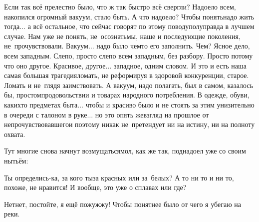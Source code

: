 Если так всё прелестно было, что ж так быстро всё свергли? Надоело всем, накопился огромный вакуум, стало быть. А что надоело? Чтобы понять\mdash надо жить тогда$\ldots$ а всё остальное, что сейчас говорят по этому поводу\mdash полуправда в лучшем случае. Нам уже не понять, не~осознать\mdash мы, наше и последующие поколения, не~прочувствовали. Вакуум$\ldots$ надо было чем\sdash то его заполнить. Чем? Ясное дело, всем западным. Слепо, просто слепо всем западным, без разбору. Просто потому что оно другое. Красивое, другое$\ldots$ западное, одним словом. И это и есть наша самая большая трагедия\mdash ломать, не реформируя в здоровой конкуренции, старое. Ломать и не~глядя заимствовать. А вакуум, надо полагать, был в самом, казалось бы, простом\mdash продовольствии и товарах народного потребления. В одежде, обуви, каких\sdash то предметах быта$\ldots$ чтобы и красиво было и не стоять за этим унизительно в очереди с талоном в руке$\ldots$ но это опять же\mdash взгляд на прошлое от непрочувствовавшего\mdash и поэтому никак не~претендует ни на истину, ни на полноту охвата.

Тут многие снова начнут возмущаться\mdash мол, как же так, поднадоел уже со своим нытьём:

\diagdash Ты определись-ка, за кого ты\mdash за красных или за~белых? А то ни то и ни то, похоже, не нравится! И вообще, это уже о сплавах или где? 

\diagdash Нет\sdash нет, постойте, я ещё пожужжу! Чтобы понятнее было от чего я убегаю на реки. %


